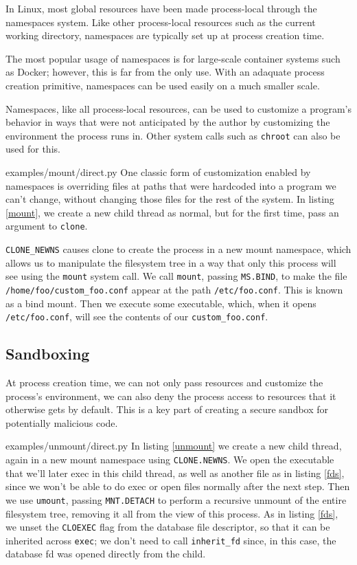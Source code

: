 \documentclass[sigplan]{acmart}
\begin{document}
In Linux, most global resources have been made process-local
through the namespaces system.
Like other process-local resources such as the current working directory,
namespaces are typically set up at process creation time.

The most popular usage of namespaces is for large-scale container systems such as Docker;
however, this is far from the only use.
With an adaquate process creation primitive,
namespaces can be used easily on a much smaller scale.

Namespaces, like all process-local resources,
can be used to customize a program's behavior
in ways that were not anticipated by the author
by customizing the environment the process runs in.
Other system calls such as \texttt{chroot} can also be used for this.


{examples/mount/direct.py}
One classic form of customization enabled by namespaces
is overriding files at paths that were hardcoded into a program we can't change,
without changing those files for the rest of the system.
In listing \ref{mount},
we create a new child thread as normal,
but for the first time,
pass an argument to \texttt{clone}.

\verb|CLONE_NEWNS| causes clone to create the process in a new mount namespace,
which allows us to manipulate the filesystem tree in a way that only this process will see
using the \texttt{mount} system call.
We call \texttt{mount}, passing \texttt{MS.BIND}, to make the file \verb|/home/foo/custom_foo.conf|
appear at the path \verb|/etc/foo.conf|.
This is known as a bind mount.
Then we execute some executable,
which, when it opens \verb|/etc/foo.conf|, will see the contents of our \verb|custom_foo.conf|.
\subsection{Sandboxing}
At process creation time,
we can not only pass resources and customize the process's environment,
we can also deny the process access to resources that it otherwise gets by default.
This is a key part of creating a secure sandbox for potentially malicious code.


{examples/unmount/direct.py}
In listing \ref{unmount}
we create a new child thread,
again in a new mount namespace using \texttt{CLONE.NEWNS}.
We open the executable that we'll later exec in this child thread,
as well as another file as in listing \ref{fds},
since we won't be able to do exec or open files normally after the next step.
Then we use \texttt{umount},
passing \texttt{MNT.DETACH} to perform a recursive unmount of the entire filesystem tree,
removing it all from the view of this process.
As in listing \ref{fds}, we unset the \texttt{CLOEXEC} flag from the database file descriptor,
so that it can be inherited across \texttt{exec};
we don't need to call \verb|inherit_fd| since, in this case, the database fd was opened directly from the child.
\end{document}
